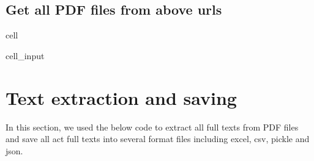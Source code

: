 \documentclass[letterpaper,10pt,english]{jupyterBook}
\begin{document}
\subsection{Get all PDF files from above urls}
\label{\detokenize{ch39:get-all-pdf-files-from-above-urls}}
\begin{sphinxuseclass}{cell}\begin{sphinxVerbatimInput}

\begin{sphinxuseclass}{cell_input}
\begin{sphinxVerbatim}[commandchars=\\\{\}]
   
\end{sphinxVerbatim}

\end{sphinxuseclass}\end{sphinxVerbatimInput}

\end{sphinxuseclass}

\section{Text extraction and saving}
\label{\detokenize{ch39:text-extraction-and-saving}}
\sphinxAtStartPar
In this section, we used the below code to extract all full texts from PDF files and save all act full texts into several format files including excel, csv, pickle and json.
\end{document}
